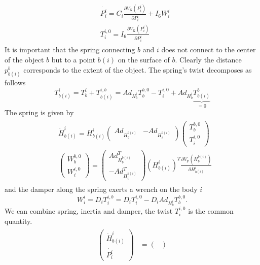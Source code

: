 \documentclass[a4paper,twoside, openright,12pt]{report}
\newcommand{\g}[1]{\text{#1}}
\begin{document}
{\begin{eqnarray}
\begin{aligned}
	&\dot{P_i^i} = C_i \frac{\partial V_\g{K}(P_i^i)}{\partial P_i^i} + I_6 W_{i}^i \\
	&T_i^{i,0} = I_6 \frac{\partial V_\g{K}(P_i^i)}{\partial P_i^i}
\end{aligned}
\end{eqnarray}
It is important that the spring connecting $b$ and $i$ does not connect to the center of the object $b$ but to a point $b(i)$ on the surface of $b$. Clearly the distance $p_{b(i)}^b$ corresponds to the extent of the object. The spring's twist decomposes as follows
\begin{equation}
T_{b(i)}^i = T_b^i + T_{b(i)}^{i,b} = Ad_{H_b^i} T_b^{b,0} - T_i^{i,0} + Ad_{H_b^i}\underbrace{T_{b(i)}^b}_{=0}
\end{equation}
The spring is given by    
\begin{eqnarray}
\begin{aligned}
&\dot{H}_{b(i)}^i = H_{b(i)}^i \begin{pmatrix}
Ad_{H_b^{b(i)}} & - Ad_{H_i^{b(i)}} \end{pmatrix} \begin{pmatrix} 
T_b^{b,0} \\ T_i^{i,0}\end{pmatrix}\\
&\begin{pmatrix} 
W_b^{b,0} \\ W_i^{i,0} \end{pmatrix} = \begin{pmatrix}
Ad_{H_b^{b(i)}}^T \\ - Ad_{H_i^{b(i)}}^T\end{pmatrix}
(H_{b(i)}^i)^T
\frac{\partial V_\g{P}(H_b^{b(i)})}{\partial H_{b(i)}^i}
\end{aligned}
\end{eqnarray}
and the damper along the spring exerts a wrench on the body $i$
\begin{equation}
W_i^i = D_i T_i^{i,b} = D_i T_i^{i,0} - D_i Ad_{H_b^i} T_b^{b,0}.
\end{equation}
We can combine spring, inertia and damper, the twist $T_i^{i,0}$ is the common quantity.
\begin{eqnarray}\label{EQ:internalimpedance}
\begin{aligned}
\begin{pmatrix}\dot{H}_{b(i)}^i \\ 
\dot{P_i^i} \end{pmatrix} &= \begin{pmatrix}

\end{pmatrix}
\end{aligned}
\end{eqnarray}}
\end{document}
